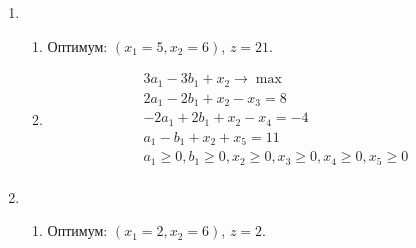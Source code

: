 \documentclass[12pt]{article}
\begin{document}
\begin{enumerate}
  \item 
    \begin{enumerate}
      \item Оптимум: $(x_1 = 5, x_2=6)$, $z=21$.
      
      \item 
      \begin{align*}
        3 a_1 - 3 b_1 + x_2 \to \max \\
        2 a_1 - 2 b_1 + x_2 - x_3 = 8 \\
        -2 a_1 + 2 b_1 + x_2 - x_4 = -4 \\
        a_1 - b_1 + x_2 + x_5 = 11 \\
        a_1 \geq 0, b_1 \geq 0, x_2 \geq 0, 
        x_3 \geq 0, x_4 \geq 0, x_5 \geq 0  \\
      \end{align*}
    \end{enumerate}
  \item 
  \begin{enumerate}
    \item Оптимум: $(x_1 = 2, x_2=6)$, $z=2$.
    

    

\end{enumerate}
\end{enumerate}
\end{document}
